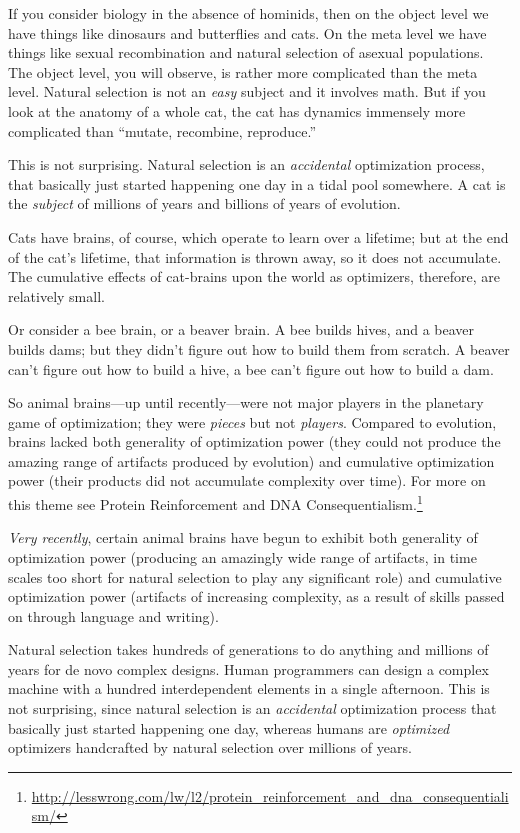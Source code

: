  If you consider biology in the absence of hominids, then on the
object level we have things like dinosaurs and butterflies and cats. On
the meta level we have things like sexual recombination and natural
selection of asexual populations. The object level, you will observe,
is rather more complicated than the meta level. Natural selection is
not an \textit{easy} subject and it involves math. But if you look at
the anatomy of a whole cat, the cat has dynamics immensely more
complicated than ``mutate, recombine,
reproduce.''


 This is not surprising. Natural selection is an
\textit{accidental} optimization process, that basically just started
happening one day in a tidal pool somewhere. A cat is the
\textit{subject} of millions of years and billions of years of
evolution.


 Cats have brains, of course, which operate to learn over a
lifetime; but at the end of the cat's lifetime, that
information is thrown away, so it does not accumulate. The cumulative
effects of cat-brains upon the world as optimizers, therefore, are
relatively small.


 Or consider a bee brain, or a beaver brain. A bee builds hives,
and a beaver builds dams; but they didn't figure out
how to build them from scratch. A beaver can't figure
out how to build a hive, a bee can't figure out how to
build a dam.


 So animal brains---up until recently---were not major players in
the planetary game of optimization; they were \textit{pieces} but not
\textit{players}. Compared to evolution, brains lacked both generality
of optimization power (they could not produce the amazing range of
artifacts produced by evolution) and cumulative optimization power
(their products did not accumulate complexity over time). For more on
this theme see Protein Reinforcement and DNA Consequentialism.\footnote{\url{http://lesswrong.com/lw/l2/protein_reinforcement_and_dna_consequentialism/}}


 \textit{Very recently}, certain animal brains have begun to
exhibit both generality of optimization power (producing an amazingly
wide range of artifacts, in time scales too short for natural selection
to play any significant role) and cumulative optimization power
(artifacts of increasing complexity, as a result of skills passed on
through language and writing).


 Natural selection takes hundreds of generations to do anything and
millions of years for de novo complex designs. Human programmers can
design a complex machine with a hundred interdependent elements in a
single afternoon. This is not surprising, since natural selection is an
\textit{accidental} optimization process that basically just started
happening one day, whereas humans are \textit{optimized} optimizers
handcrafted by natural selection over millions of years.


